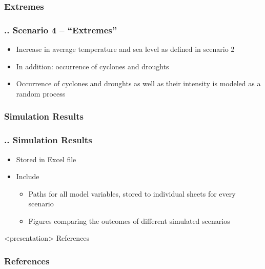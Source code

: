 \documentclass[11pt,aspectratio=169]{beamer}
\begin{document}
\subsubsection{Extremes}
\begin{frame}
\frametitle{{\thesection.\thesubsection.\thesubsubsection} Scenario 4 -- "`Extremes"'}
\begin{itemize}
	\item Increase in average temperature and sea level as defined in scenario 2
	\item In addition: occurrence of cyclones and droughts 
	\item Occurrence of cyclones and droughts as well as their intensity is modeled as a random process		
\end{itemize}
\end{frame}

\subsubsection{Simulation Results}
\begin{frame}
\frametitle{{\thesection.\thesubsection.\thesubsubsection} Simulation Results}
\begin{itemize}
\item Stored in Excel file 
\item Include 
	\begin{itemize}
		\item Paths for all model variables, stored to individual sheets for every scenario
		\item Figures comparing the outcomes of different simulated scenarios
		\end{itemize}
\end{itemize}
\end{frame}

\begin{frame}<presentation>
	\centering \huge{References}
\end{frame}

\begin{frame}[allowframebreaks]%
\frametitle{References}
\scriptsize{
\printbibliography}
\end{frame}
\end{document}
